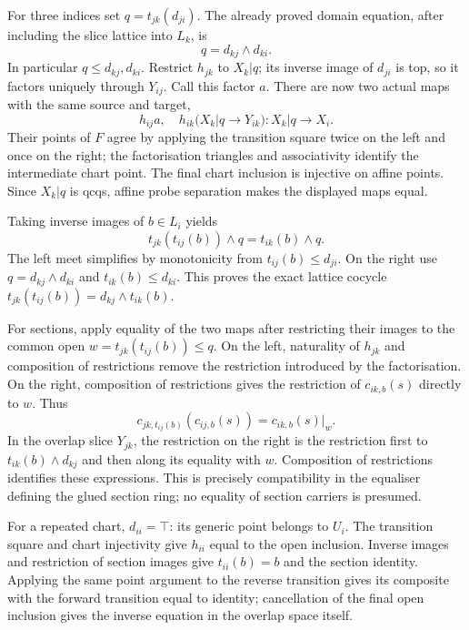 \documentclass[11pt]{amsart}
\theoremstyle{definition}\newtheorem{definition}[theorem]{Definition}
\theoremstyle{remark}\newtheorem{remark}[theorem]{Remark}
\begin{document}
For three indices set $q=t_{jk}(d_{ji})$. The already proved domain
equation, after including the slice lattice into $L_k$, is
\[
 q=d_{kj}\wedge d_{ki}.
\]
In particular $q\leq d_{kj},d_{ki}$. Restrict $h_{jk}$ to $X_k|q$;
its inverse image of $d_{ji}$ is top, so it factors uniquely through
$Y_{ij}$. Call this factor $a$. There are now two actual maps with the
same source and target,
\[
 h_{ij}a,\quad h_{ik}\bigl(X_k|q\longrightarrow Y_{ik}\bigr)
       :X_k|q\longrightarrow X_i.
\]
Their points of $F$ agree by applying the transition square twice on
the left and once on the right; the factorisation triangles and
associativity identify the intermediate chart point. The final chart
inclusion is injective on affine points. Since $X_k|q$ is qcqs, affine
probe separation makes the displayed maps equal.

Taking inverse images of $b\in L_i$ yields
\[
 t_{jk}(t_{ij}(b))\wedge q=t_{ik}(b)\wedge q.
\]
The left meet simplifies by monotonicity from $t_{ij}(b)\leq d_{ji}$.
On the right use $q=d_{kj}\wedge d_{ki}$ and
$t_{ik}(b)\leq d_{ki}$. This proves the exact lattice cocycle
$t_{jk}(t_{ij}(b))=d_{kj}\wedge t_{ik}(b)$.

For sections, apply equality of the two maps after restricting their
images to the common open $w=t_{jk}(t_{ij}(b))\leq q$. On the left,
naturality of $h_{jk}$ and composition of restrictions remove the
restriction introduced by the factorisation. On the right, composition
of restrictions gives the restriction of $c_{ik,b}(s)$ directly to $w$.
Thus
\[
 c_{jk,t_{ij}(b)}(c_{ij,b}(s))
       =c_{ik,b}(s)|_w.
\]
In the overlap slice $Y_{jk}$, the restriction on the right is the
restriction first to $t_{ik}(b)\wedge d_{kj}$ and then along its equality
with $w$. Composition of restrictions identifies these expressions.
This is precisely compatibility in the equaliser defining the glued
section ring; no equality of section carriers is presumed.

For a repeated chart, $d_{ii}=\top$: its generic point belongs to $U_i$.
The transition square and chart injectivity give $h_{ii}$ equal to the
open inclusion. Inverse images and restriction of section images give
$t_{ii}(b)=b$ and the section identity. Applying the same point argument
to the reverse transition gives its composite with the forward
transition equal to identity; cancellation of the final open inclusion
gives the inverse equation in the overlap space itself.
\end{document}
